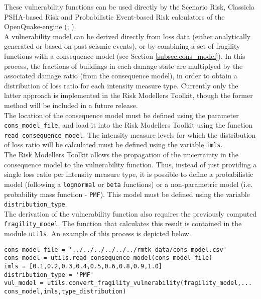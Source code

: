 These vulnerability functions can be used directly by the Scenario Risk, Classicla PSHA-based Risk and Probabilistic Event-based Risk calculators of the OpenQuake-engine (\cite{SilvaEtAl2014a}; \cite{PaganiEtAl2014a}). \\

A vulnerability model can be derived directly from loss data (either analytically generated or based on past seismic events), or by combining a set of fragility functions with a consequence model (see Section \ref{subsec:cons_model}). In this process, the fractions of buildings in each damage state are multiplyed by the associated damage ratio (from the consequence model), in order to obtain a distribution of loss ratio for each intensity measure type. Currently only the latter approach is implemented in the Risk Modellers Toolkit, though the former method will be included in a future release.\\

The location of the consequence model must be defined using the parameter \verb=cons_model_file=, and load it into the Risk Modellers Toolkit using the function \verb=read_consequence_model=. The intensity measure levels for which the distribution of loss ratio will be calculated must be defined using the variable \verb=imls=.\\

The Risk Modellers Toolkit allows the propagation of the uncertainty in the consequence model to the vulnerability function. Thus, instead of just providing a single loss ratio per intensity measure type, it is possible to define a probabilistic model (following a \verb=lognormal= or \verb=beta= functions) or a non-parametric model (i.e. probability mass function - \verb=PMF=). This model must be defined using the variable \verb= distribution_type=.\\

The derivation of the vulnerability function also requires the previously computed \verb=fragility_model=. The function that calculates this result is contained in the module \verb=utils=. An example of this process is depicted below.

\begin{Verbatim}[frame=single, commandchars=\\\{\}, samepage=true]
cons_model_file = '../../../../../../rmtk_data/cons_model.csv'
cons_model = utils.read_consequence_model(cons_model_file)
imls = [0.1,0.2,0.3,0.4,0.5,0.6,0.8,0.9,1.0]
distribution_type = 'PMF'
vul_model = utils.convert_fragility_vulnerability(fragility_model,...
cons_model,imls,type_distribution)
\end{Verbatim}

